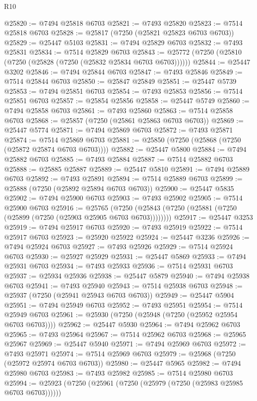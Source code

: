 \begin{lexlean}{R10}
\begin{coremodule}
@25820 := @7494 @25818 @6703
@25821 := @7493 @25820
@25823 := @7514 @25818 @6703
@25828 := @25817 (@7250 (@25821 @25823 @6703 @6703))
@25829 := @25447 @5103
@25831 := @7494 @25829 @6703
@25832 := @7493 @25831
@25834 := @7514 @25829 @6703
@25843 := @25772 (@7250 (@25810 (@7250 (@25828 (@7250 (@25832 @25834 @6703 @6703))))))
@25844 := @25447 @3202
@25846 := @7494 @25844 @6703
@25847 := @7493 @25846
@25849 := @7514 @25844 @6703
@25850 := @25847 @25849
@25851 := @25447 @5739
@25853 := @7494 @25851 @6703
@25854 := @7493 @25853
@25856 := @7514 @25851 @6703
@25857 := @25854 @25856
@25858 := @25447 @5749
@25860 := @7494 @25858 @6703
@25861 := @7493 @25860
@25863 := @7514 @25858 @6703
@25868 := @25857 (@7250 (@25861 @25863 @6703 @6703))
@25869 := @25447 @5774
@25871 := @7494 @25869 @6703
@25872 := @7493 @25871
@25874 := @7514 @25869 @6703
@25881 := @25850 (@7250 (@25868 (@7250 (@25872 @25874 @6703 @6703))))
@25882 := @25447 @5800
@25884 := @7494 @25882 @6703
@25885 := @7493 @25884
@25887 := @7514 @25882 @6703
@25888 := @25885 @25887
@25889 := @25447 @5810
@25891 := @7494 @25889 @6703
@25892 := @7493 @25891
@25894 := @7514 @25889 @6703
@25899 := @25888 (@7250 (@25892 @25894 @6703 @6703))
@25900 := @25447 @5835
@25902 := @7494 @25900 @6703
@25903 := @7493 @25902
@25905 := @7514 @25900 @6703
@25916 := @25765
    (@7250 (@25843 (@7250 (@25881 (@7250 (@25899 (@7250 (@25903 @25905 @6703 @6703))))))))
@25917 := @25447 @3253
@25919 := @7494 @25917 @6703
@25920 := @7493 @25919
@25922 := @7514 @25917 @6703
@25923 := @25920 @25922
@25924 := @25447 @3236
@25926 := @7494 @25924 @6703
@25927 := @7493 @25926
@25929 := @7514 @25924 @6703
@25930 := @25927 @25929
@25931 := @25447 @5869
@25933 := @7494 @25931 @6703
@25934 := @7493 @25933
@25936 := @7514 @25931 @6703
@25937 := @25934 @25936
@25938 := @25447 @5879
@25940 := @7494 @25938 @6703
@25941 := @7493 @25940
@25943 := @7514 @25938 @6703
@25948 := @25937 (@7250 (@25941 @25943 @6703 @6703))
@25949 := @25447 @5904
@25951 := @7494 @25949 @6703
@25952 := @7493 @25951
@25954 := @7514 @25949 @6703
@25961 := @25930 (@7250 (@25948 (@7250 (@25952 @25954 @6703 @6703))))
@25962 := @25447 @5930
@25964 := @7494 @25962 @6703
@25965 := @7493 @25964
@25967 := @7514 @25962 @6703
@25968 := @25965 @25967
@25969 := @25447 @5940
@25971 := @7494 @25969 @6703
@25972 := @7493 @25971
@25974 := @7514 @25969 @6703
@25979 := @25968 (@7250 (@25972 @25974 @6703 @6703))
@25980 := @25447 @5965
@25982 := @7494 @25980 @6703
@25983 := @7493 @25982
@25985 := @7514 @25980 @6703
@25994 := @25923 (@7250 (@25961 (@7250 (@25979 (@7250 (@25983 @25985 @6703 @6703))))))

\end{coremodule}
\end{lexlean}
